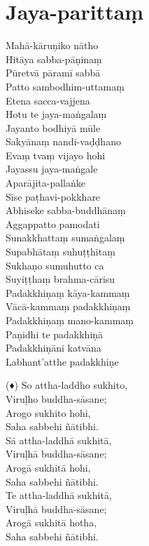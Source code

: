 \section{Jaya-parittaṃ}

\begin{paritta}
Mahā-kāruṇiko nātho\\
Hitāya sabba-pāṇinaṃ\\
Pūretvā pāramī sabbā\\
Patto sambodhim-uttamaṃ\\
Etena sacca-vajjena\\
Hotu te jaya-maṅgalaṃ\\
Jayanto bodhiyā mūle\\
Sakyānaṃ nandi-vaḍḍhano\\
Evaṃ tvaṃ vijayo hohi\\
Jayassu jaya-maṅgale\\
Aparājita-pallaṅke\\
Sīse paṭhavi-pokkhare\\
Abhiseke sabba-buddhānaṃ\\
Aggappatto pamodati\\
Sunakkhattaṃ sumaṅgalaṃ\\
Supabhātaṃ suhuṭṭhitaṃ\\
Sukhaṇo sumuhutto ca\\
Suyiṭṭhaṃ brahma-cārisu\\
Padakkhiṇaṃ kāya-kammaṃ\\
Vācā-kammaṃ padakkhiṇaṃ\\
Padakkhiṇaṃ mano-kammaṃ\\
Paṇidhi te padakkhiṇā\\
Padakkhiṇāni katvāna\\
Labhant'atthe padakkhiṇe 
\end{paritta}


\clearpage

\begin{paritta}

(♦) So attha-laddho sukhito,\\
Viruḷho buddha-sāsane;\\
Arogo sukhito hohi,\\
Saha sabbehi ñātibhi.\\
Sā attha-laddhā sukhitā,\\
Viruḷhā buddha-sāsane;\\
Arogā sukhitā hohi,\\
Saha sabbehi ñātibhi.\\
Te attha-laddhā sukhitā,\\
Viruḷhā buddha-sāsane;\\
Arogā sukhitā hotha,\\
Saha sabbehi ñātibhi.

\end{paritta}


